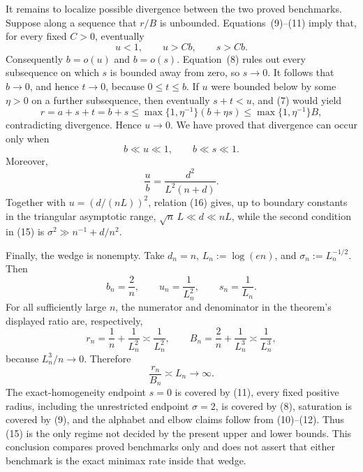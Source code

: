 It remains to localize possible divergence between the two proved benchmarks.  Suppose along a sequence that \(r/B\) is unbounded.  Equations~(9)--(11) imply that, for every fixed \(C>0\), eventually
\[
 u<1,\qquad u>Cb,\qquad s>Cb.
\tag{13}
\]
Consequently \(b=o(u)\) and \(b=o(s)\).  Equation~(8) rules out every subsequence on which \(s\) is bounded away from zero, so \(s\to0\).  It follows that \(b\to0\), and hence \(t\to0\), because \(0\le t\le b\).  If \(u\) were bounded below by some \(\eta>0\) on a further subsequence, then eventually \(s+t<u\), and (7) would yield
\[
 r=a+s+t=b+s
 \le \max\{1,\eta^{-1}\}(b+\eta s)
 \le \max\{1,\eta^{-1}\}B,
\tag{14}
\]
contradicting divergence.  Hence \(u\to0\).  We have proved that divergence can occur only when
\[
 b\ll u\ll1,
 \qquad b\ll s\ll1.
\tag{15}
\]
Moreover,
\[
 \frac ub=\frac{d^2}{L^2(n+d)}.
\tag{16}
\]
Together with \(u=(d/(nL))^2\), relation (16) gives, up to boundary constants in the triangular asymptotic range, \(\sqrt n\,L\ll d\ll nL\), while the second condition in (15) is \(\sigma^2\gg n^{-1}+d/n^2\).

Finally, the wedge is nonempty.  Take \(d_n=n\), \(L_n:=\log(en)\), and \(\sigma_n:=L_n^{-1/2}\).  Then
\[
 b_n=\frac2n,\qquad u_n=\frac1{L_n^2},
 \qquad s_n=\frac1{L_n}.
\tag{17}
\]
For all sufficiently large \(n\), the numerator and denominator in the theorem's displayed ratio are, respectively,
\[
 r_n=\frac1n+\frac1{L_n^2}\asymp\frac1{L_n^2},
 \qquad
 B_n=\frac2n+\frac1{L_n^3}\asymp\frac1{L_n^3},
\tag{18}
\]
because \(L_n^3/n\to0\).  Therefore
\[
 \frac{r_n}{B_n}\asymp L_n\longrightarrow\infty.
\tag{19}
\]
The exact-homogeneity endpoint \(s=0\) is covered by (11), every fixed positive radius, including the unrestricted endpoint \(\sigma=2\), is covered by (8), saturation is covered by (9), and the alphabet and elbow claims follow from (10)--(12).  Thus (15) is the only regime not decided by the present upper and lower bounds.  This conclusion compares proved benchmarks only and does not assert that either benchmark is the exact minimax rate inside that wedge.